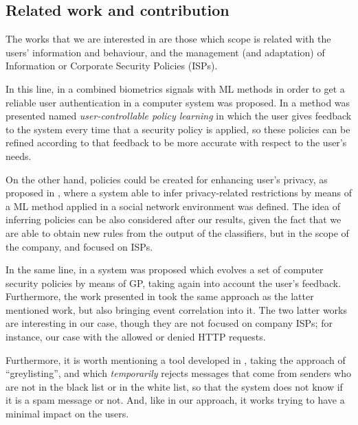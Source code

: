 \documentclass{llncs}
\begin{document}
%
\subsection{Related work and contribution}
\label{subsec:relatedworks}

The works that we are interested in are those which scope is related with the users' information and behaviour, and the management (and adaptation) of Information or Corporate Security Policies (ISPs).

In this line, in \cite{cognitive_security_08} a combined biometrics signals with ML methods in order to get a reliable user authentication in a computer system was proposed. In \cite{user-controllable_learning_08}  a method was presented named \textit{user-controllable policy learning} in which the user gives feedback to the system every time that a security policy is applied, so these policies can be refined according to that feedback to be more accurate with respect to the user's needs.

On the other hand, policies could be created for enhancing user's privacy, as proposed  in \cite{inferring_policies_socialnetworks_09}, where a system able to infer privacy-related restrictions by means of a ML method applied in a social network environment was defined. The idea of inferring policies can be also considered after our results, given the fact that we are able to obtain new rules from the output of the classifiers, but in the scope of the company, and focused on ISPs.

In the same line, in \cite{sec_policy_evolution_gp_08,pol_evol_gp_3_approaches_08}  a system  was proposed which evolves a set of computer security policies by means of GP, taking again into account the user's feedback. Furthermore, the work presented in  \cite{rule_generation_gp_09} took the same approach as the latter mentioned work, but also bringing event correlation into it. The two latter works are interesting in our case, though they are not focused on company ISPs; for instance, our case with the allowed or denied HTTP requests.

Furthermore, it is worth mentioning a tool developed in  \cite{harris2003next}, taking the approach of ``greylisting'',
and which \textit{temporarily} rejects messages that come from senders
who are not in the black list or in the white list, so that the system
does not know if it is a spam message or not. And, like in our
approach, it works trying to have a minimal impact on the users.
\end{document}
